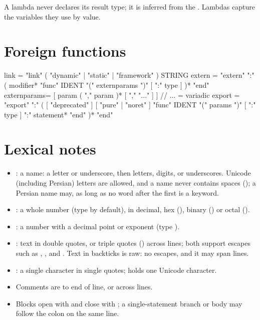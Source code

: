 \noindent A lambda never declares its result type; it is inferred from the
. Lambdas capture the variables they use by value.

\section*{Foreign functions}

\begin{shell}
link        = "link" ( "dynamic" | "static" | "framework" ) STRING
extern      = "extern" ":"
                  ( modifier* "func" IDENT "(" externparams ")" [ ":" type ] )*
              "end"
externparams= [ param ( "," param )* [ "," "..." ] ]   // ... = variadic
export      = "export" ":"
                  ( [ "deprecated" ] [ "pure" | "noret" ]
                    "func" IDENT "(" params ")" [ ":" type ] ":"
                        statement*
                    "end" )*
              "end"
\end{shell}

\section*{Lexical notes}

\begin{itemize}[leftmargin=1.4em]
  \item {}: a name: a letter or underscore, then letters, digits, or
        underscores. Unicode (including Persian) letters are allowed, and a
        name never contains spaces (); a Persian name may, as long as no
        word after the first is a keyword.
  \item {}: a whole number (type  by default), in decimal,
        hex (), binary () or octal ().
  \item {}: a number with a decimal point or exponent (type
        ).
  \item {}: text in double quotes, or triple quotes
        () across lines; both support escapes such as
        , ,
        \code{\textbackslash\textbackslash} and .
        Text in backticks is raw: no escapes, and it may span lines.
  \item {}: a single character in single quotes;  holds
        one Unicode character.
  \item Comments are \code{//} to end of line, or  across lines.
  \item Blocks open with \code{:} and close with ; a single-statement
        branch or body may follow the colon on the same line.
\end{itemize}
